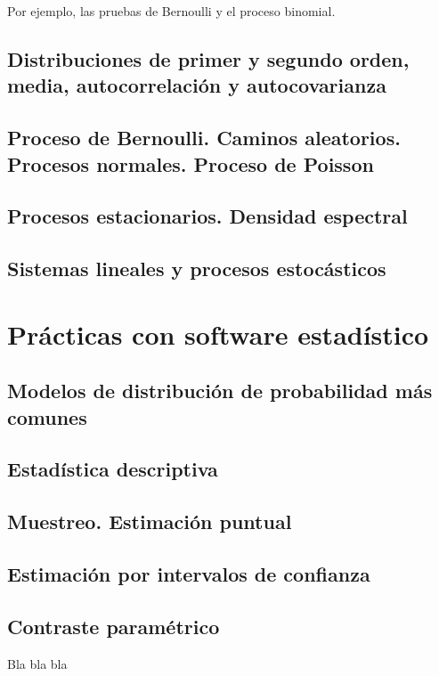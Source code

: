 \documentclass[a4paper]{book}
\numberwithin{figure}{section}
\numberwithin{equation}{subsection}
\numberwithin{figure}{chapter}
\theoremstyle{definition}
\begin{document}
Por ejemplo, las pruebas de Bernoulli y el proceso binomial.



\section{Distribuciones de primer y segundo orden, media, autocorrelación y autocovarianza}

\section{Proceso de Bernoulli. Caminos aleatorios. Procesos normales. Proceso de Poisson}

\section{Procesos estacionarios. Densidad espectral}

\section{Sistemas lineales y procesos estocásticos}

\chapter{Prácticas con software estadístico}


\section{Modelos de distribución de probabilidad más comunes}

\section{Estadística descriptiva}

\section{Muestreo. Estimación puntual}

\section{Estimación por intervalos de confianza}

\section{Contraste paramétrico}
Bla bla bla



%
%
\end{document}
